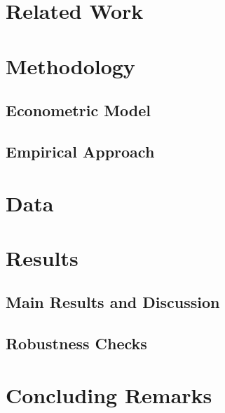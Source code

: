 \documentclass[12pt,a4paper,oneside]{article}
\begin{document}
		\section{Related Work}
		
		
				
		\section{Methodology}
						
		\subsection{Econometric Model}
		
				
		\subsection{Empirical Approach}
		
		
		
		\section{Data}
		
		\section{Results \label{rp}}
		
		
		\subsection{Main Results and Discussion}
		
				
		\subsection{Robustness Checks}
						
		
		\section{Concluding Remarks}
				
		
				
		
		
		
		\cleardoublepage
		
		\appendix
		
 		
	
\end{document}
